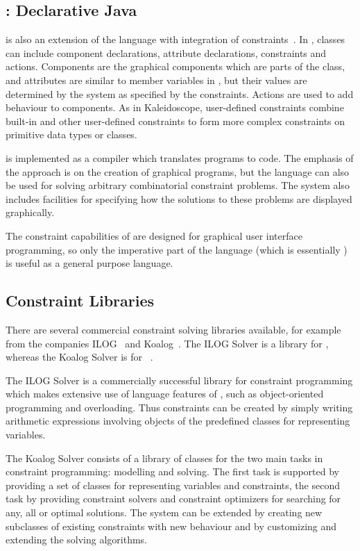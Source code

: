 \subsection{\djava{}: Declarative Java}

\djava{} is also an extension of the \java{} language with integration
of constraints~\cite{zhou98dj}.  In \djava{}, classes can include
component declarations, attribute declarations, constraints and
actions.  Components are the graphical components which are parts of
the class, and attributes are similar to member variables in \java{},
but their values are determined by the system as specified by the
constraints.  Actions are used to add behaviour to components.  As in
Kaleidoscope, user-defined constraints combine built-in and other
user-defined constraints to form more complex constraints on primitive
data types or classes.

\djava{} is implemented as a compiler which translates \djava{}
programs to \java{} code.  The emphasis of the \djava{} approach is on
the creation of graphical programs, but the language can also be used
for solving arbitrary combinatorial constraint problems.  The system
also includes facilities for specifying how the solutions to these
problems are displayed graphically.

The constraint capabilities of \djava{} are designed for graphical
user interface programming, so only the imperative part of the
language (which is essentially \java{}) is useful as a general purpose
language.

\subsection{Constraint Libraries}


There are several commercial constraint solving libraries available,
for example from the companies ILOG~\cite{ilogwww} and
Koalog~\cite{koalogwww}.  The ILOG Solver is a library for
\cplusplus{} \cite{ILOG}, whereas the Koalog Solver is for
\java{}~\cite{koalog}.

The ILOG Solver is a commercially successful library for constraint
programming which makes extensive use of language features of
\cplusplus{}, such as object-oriented programming and overloading.
Thus constraints can be created by simply writing arithmetic
expressions involving objects of the predefined classes for
representing variables.
 
The Koalog Solver consists of a library of classes for the two main
tasks in constraint programming: modelling and solving.  The first
task is supported by providing a set of classes for representing
variables and constraints, the second task by providing constraint
solvers and constraint optimizers for searching for any, all or
optimal solutions.  The system can be extended by creating new
subclasses of existing constraints with new behaviour and by
customizing and extending the solving algorithms.

